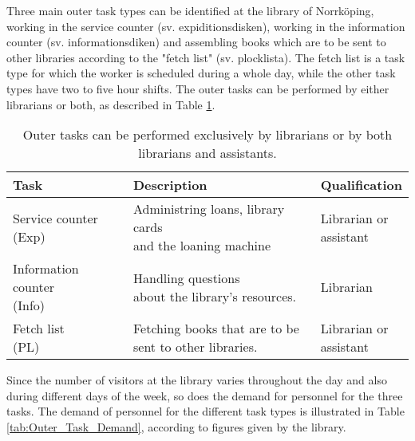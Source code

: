 Three main outer task types can be identified at the library of Norrköping, working in the service counter (sv. expiditionsdisken), working in the information counter (sv. informationsdiken)  and assembling books which are to be sent to other libraries according to the "fetch list" (sv. plocklista). The fetch list is a task type for which the worker is scheduled during a whole day, while the other task types have two to five hour shifts. The outer tasks can be performed by either librarians or both, as described in Table \ref{tab:Outer_Tasks}.

\begin{table}[h]
\centering
\caption{Outer tasks can be performed exclusively by librarians or by both librarians and assistants.}
\label{tab:Outer_Tasks}
\begin{tabularx}{\textwidth}{|l|l|X|}
\hline
\textbf{Task} & \textbf{Description} & \textbf{Qualification}\\ \hline 
\specialcell[t]{Service counter \\ (Exp)}  & \specialcell[t]{Administring loans, library cards\\ and the loaning machine} & \specialcell[t]{Librarian or \\  assistant} 
\\ \hline
\specialcell[t]{Information counter \\ (Info)} & \specialcell[t]{Handling questions \\about the library's resources.} & Librarian
\\ \hline 
\specialcell[t]{Fetch list \\(PL)} & \specialcell[t]{Fetching books that are to be \\sent to other libraries.} & \specialcell[t]{Librarian  or \\  assistant}
\\ \hline 
\end{tabularx}
\end{table} 

Since the number of visitors at the library varies throughout the day and also during different days of the week, so does the demand for personnel for the three tasks. The demand of personnel for the different task types is illustrated in Table \ref{tab:Outer_Task_Demand}, according to figures given by the library. 



